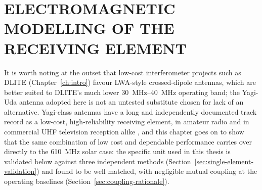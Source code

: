 
\chapter{ELECTROMAGNETIC MODELLING OF THE RECEIVING ELEMENT}
\label{ch:antenna}

It is worth noting at the outset that low-cost interferometer projects such as
DLITE (Chapter~\ref{ch:intro}) favour LWA-style crossed-dipole antennas, which
are better suited to DLITE's much lower \SIrange{30}{40}{\mega\hertz} operating
band; the Yagi-Uda antenna adopted here is not an untested substitute chosen
for lack of an alternative. Yagi-class antennas have a long and independently
documented track record as a low-cost, high-reliability receiving element,
in amateur radio and in commercial UHF television reception alike
\citep{yagi1928,balanis2016,kraus1988}, and this chapter goes on to show that
the same combination of low cost and dependable performance carries over
directly to the \SI{610}{\mega\hertz} solar case: the specific unit used in
this thesis is validated below against three independent methods
(Section~\ref{sec:single-element-validation}) and found to be well matched,
with negligible mutual coupling at the operating baselines
(Section~\ref{sec:coupling-rationale}).

